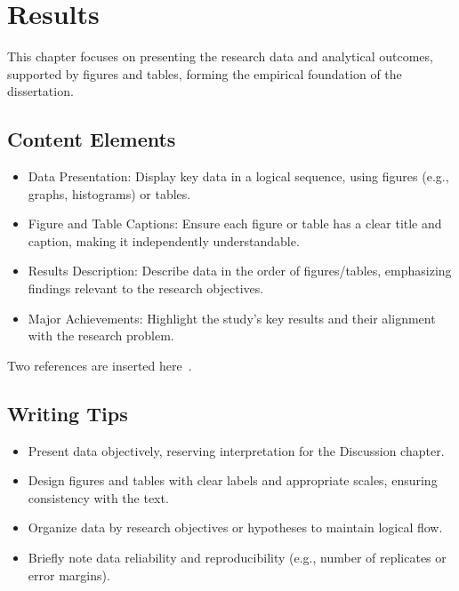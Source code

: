 \chapter{Results}
 This chapter focuses on presenting the research data and analytical outcomes, supported by figures and tables, forming the empirical foundation of the dissertation.


\section{Content Elements}
\begin{itemize}
    \item Data Presentation: Display key data in a logical sequence, using figures (e.g., graphs, histograms) or tables.
    \item Figure and Table Captions: Ensure each figure or table has a clear title and caption, making it independently understandable.
    \item Results Description: Describe data in the order of figures/tables, emphasizing findings relevant to the research objectives.
    \item Major Achievements: Highlight the study’s key results and their alignment with the research problem.


\end{itemize}

Two references are inserted here~\cite{doi:10.1021/jp211439d,PhysRevB.83.075403}.


\section{Writing Tips}
\begin{itemize}
    \item Present data objectively, reserving interpretation for the Discussion chapter.
    \item Design figures and tables with clear labels and appropriate scales, ensuring consistency with the text.
    \item Organize data by research objectives or hypotheses to maintain logical flow.
    \item Briefly note data reliability and reproducibility (e.g., number of replicates or error margins).
\end{itemize}
